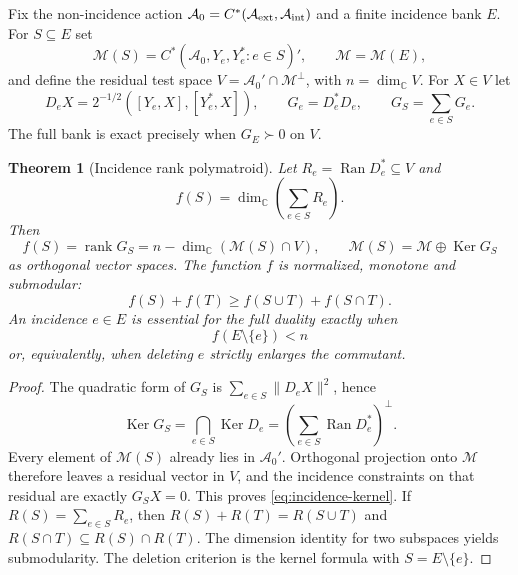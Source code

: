 \documentclass[11pt]{article}
\newtheorem{theorem}{Theorem}[section]
\theoremstyle{definition}
\theoremstyle{remark}
\newcommand{\C}{\mathbb C}
\newcommand{\rank}{\operatorname{rank}}
\newcommand{\Ker}{\operatorname{Ker}}
\newcommand{\Ran}{\operatorname{Ran}}
\newcommand{\M}{\mathcal M}
\begin{document}
Fix the non-incidence action
$\mathcal A_0=C^*(\mathcal A_{\rm ext},\mathcal A_{\rm int})$ and a finite
incidence bank $E$.  For $S\subseteq E$ set
\[
 \M(S)=C^*(\mathcal A_0,Y_e,Y_e^*:e\in S)',
 \qquad \M=\M(E),
\]
and define the residual test space
$V=\mathcal A_0'\cap\M^\perp$, with $n=\dim_\C V$.  For $X\in V$ let
\begin{equation}
 D_eX=2^{-1/2}([Y_e,X],[Y_e^*,X]),
 \qquad G_e=D_e^*D_e,
 \qquad G_S=\sum_{e\in S}G_e.
 \label{eq:incidence-forms}
\end{equation}
The full bank is exact precisely when $G_E\succ0$ on $V$.

\begin{theorem}[Incidence rank polymatroid]
\label{thm:incidence-polymatroid}
Let $R_e=\Ran D_e^*\subseteq V$ and
\begin{equation}
 f(S)=\dim_\C\!\left(\sum_{e\in S}R_e\right).
 \label{eq:incidence-rank}
\end{equation}
Then
\begin{equation}
 \boxed{
 f(S)=\rank G_S
     =n-\dim_\C(\M(S)\cap V),
 \qquad
 \M(S)=\M\oplus\Ker G_S}
 \label{eq:incidence-kernel}
\end{equation}
as orthogonal vector spaces.  The function $f$ is normalized, monotone and
submodular:
\begin{equation}
 f(S)+f(T)\ge f(S\cup T)+f(S\cap T).
 \label{eq:incidence-submodular}
\end{equation}
An incidence $e\in E$ is essential for the full duality exactly when
\begin{equation}
 \boxed{f(E\setminus\{e\})<n}
 \label{eq:essential-incidence}
\end{equation}
or, equivalently, when deleting $e$ strictly enlarges the commutant.
\end{theorem}

\begin{proof}
The quadratic form of $G_S$ is
$\sum_{e\in S}\|D_eX\|^2$, hence
\[
 \Ker G_S=\bigcap_{e\in S}\Ker D_e
 =\left(\sum_{e\in S}\Ran D_e^*\right)^\perp.
\]
Every element of $\M(S)$ already lies in $\mathcal A_0'$.  Orthogonal
projection onto $\M$ therefore leaves a residual vector in $V$, and the
incidence constraints on that residual are exactly $G_SX=0$.  This proves
\eqref{eq:incidence-kernel}.  If $R(S)=\sum_{e\in S}R_e$, then
$R(S)+R(T)=R(S\cup T)$ and
$R(S\cap T)\subseteq R(S)\cap R(T)$.  The dimension identity for two
subspaces yields submodularity.  The deletion criterion is the kernel formula
with $S=E\setminus\{e\}$.
\end{proof}
\end{document}
